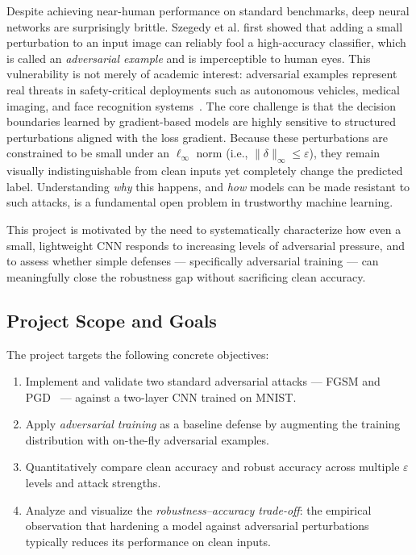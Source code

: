 \documentclass[conference,10pt]{IEEEtran}
\begin{document}
Despite achieving near-human performance on standard benchmarks, deep
neural networks are surprisingly brittle. Szegedy et al.\cite{szegedy2014} first showed that adding a small perturbation to an input image can reliably fool a high-accuracy classifier, which is called an \emph{adversarial example} and is imperceptible to human eyes. This vulnerability is not merely of academic interest: adversarial examples represent real threats in safety-critical deployments such as autonomous vehicles, medical imaging, and face recognition systems~\cite{goodfellow2015fgsm}.
The core challenge is that the decision boundaries learned by gradient-based
models are highly sensitive to structured perturbations aligned with the loss
gradient. Because these perturbations are constrained to be small under an
$\ell_\infty$ norm (i.e., $\|\delta\|_\infty \leq \varepsilon$), they remain
visually indistinguishable from clean inputs yet completely change the
predicted label. Understanding \emph{why} this happens, and \emph{how} models
can be made resistant to such attacks, is a fundamental open problem in
trustworthy machine learning.

This project is motivated by the need to systematically characterize how even a small, lightweight CNN responds to increasing levels of adversarial pressure, and to assess whether simple defenses — specifically adversarial training — can meaningfully close the robustness gap without sacrificing clean accuracy.

\subsection{Project Scope and Goals}

The project targets the following concrete objectives:

\begin{enumerate}
    \item Implement and validate two standard adversarial attacks — FGSM
          \cite{goodfellow2015fgsm} and PGD~\cite{madry2018pgd} — against
          a two-layer CNN trained on MNIST.

    \item Apply \emph{adversarial training} as a baseline defense by
          augmenting the training distribution with on-the-fly adversarial
          examples.

    \item Quantitatively compare clean accuracy and robust accuracy across
          multiple $\varepsilon$ levels and attack strengths.

    \item Analyze and visualize the \emph{robustness–accuracy trade-off}:
          the empirical observation that hardening a model against adversarial
          perturbations typically reduces its performance on clean inputs.
\end{enumerate}
\end{document}
